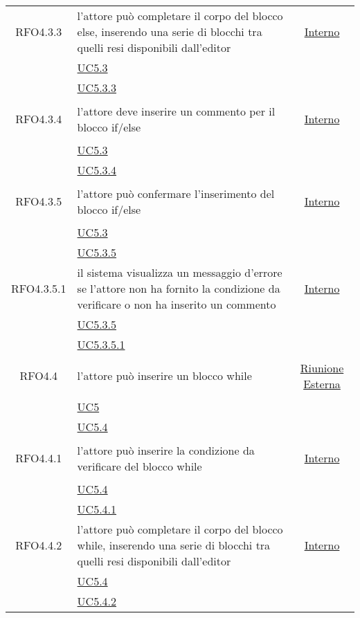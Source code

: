 \begin{longtable}{|c|>{\centering}m{7cm}|c|}
\hypertarget{RFO4.3.3}{RFO4.3.3} & l'attore può completare il corpo del blocco else, inserendo una serie di blocchi tra quelli resi disponibili dall'editor  & \hyperlink{Interno}{Interno}\\
& \hyperref[UC5.3]{UC5.3}\\
& \hyperref[UC5.3.3]{UC5.3.3}\\ \hline

\hypertarget{RFO4.3.4}{RFO4.3.4} & l’attore deve inserire un commento per il blocco if/else & \hyperlink{Interno}{Interno}\\
& \hyperref[UC5.3]{UC5.3}\\
& \hyperref[UC5.3.4]{UC5.3.4}\\ \hline

\hypertarget{RFO4.3.5}{RFO4.3.5} & l’attore può confermare l'inserimento del blocco if/else & \hyperlink{Interno}{Interno}\\
& \hyperref[UC5.3]{UC5.3}\\
& \hyperref[UC5.3.5]{UC5.3.5}\\ \hline

\hypertarget{RFO4.3.5.1}{RFO4.3.5.1} & il sistema visualizza un messaggio d’errore se l'attore non ha fornito la condizione da verificare o non ha inserito un commento & \hyperlink{Interno}{Interno}\\
& \hyperref[UC5.3.5]{UC5.3.5}\\
& \hyperref[UC5.3.5.1]{UC5.3.5.1}\\ \hline

\hypertarget{RFO4.4}{RFO4.4} & l'attore può inserire un blocco while & \hyperlink{Riunione Esterna}{Riunione Esterna}\\
& \hyperref[UC5]{UC5}\\
& \hyperref[UC5.4]{UC5.4}\\ \hline

\hypertarget{RFO4.4.1}{RFO4.4.1} & l'attore può inserire la condizione da verificare del blocco while & \hyperlink{Interno}{Interno}\\
& \hyperref[UC5.4]{UC5.4}\\
& \hyperref[UC5.4.1]{UC5.4.1}\\ \hline

\hypertarget{RFO4.4.2}{RFO4.4.2} & l'attore può completare il corpo del blocco while, inserendo una serie di blocchi tra quelli resi disponibili dall'editor & \hyperlink{Interno}{Interno}\\
& \hyperref[UC5.4]{UC5.4}\\
& \hyperref[UC5.4.2]{UC5.4.2}\\ \hline


\end{longtable}
